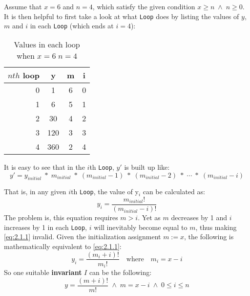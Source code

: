 Assume that $x = 6$ and $n = 4$, which satisfy the given condition $ x \geq n \;\land\; n \geq 0$.  It is then helpful to first take a look at what \texttt{Loop} does by listing the values of $y$, $m$ and $i$ in each \texttt{Loop} (which ends at $i = 4$):

\begin{table}[h]
  \centering
  \begin{tabular}{r||c|c|c}
    \hline
    $nth$ loop & y & m & i \\
    \hline
    0 & 1 & 6 & 0 \\
    1 & 6 & 5 & 1 \\
    2 & 30 & 4 & 2 \\
    3 & 120 & 3 & 3 \\
    4 & 360 & 2 & 4 \\
    \hline
  \end{tabular}
  \caption{Values in each loop when \(x=6\;n=4\)}
  \label{tab:loop}
\end{table}

It is easy to see that in the $i$th \texttt{Loop}, $y'$ is built up like:
\[
  y' =
  y_{initial} \;*\; m_{initial}\;*\;(m_{initial} - 1)\;*\;(m_{initial}-  2)\;*\;\dotsb\;*\; (m_{initial} - i)
\]

That is, in any given $i$th \texttt{Loop},  the value of y$_{i}$ can be calculated as:
\begin{equation}
\label{eq:2.1.1}
y_{i} = \frac{m_{initial}!}{(m_{initial} - i)!}
\end{equation}
The problem is, this equation requires $m > i$.  Yet as $m$ decreases by 1 and $i$ increases by 1 in each \texttt{Loop}, $i$ will inevitably become equal to $m$, thus making \eqref{eq:2.1.1} invalid.  Given the initialization assignment \(m:=x\), the following is mathematically equivalent to \eqref{eq:2.1.1}:
\[
  y_{i} = \frac{(m_{i}+i)!}{m_{i}!} \quad \text{where}\quad m_{i}= x - i
\]
So one suitable \textbf{invariant} \(I\) can be the following:
\begin{equation}
\label{eq:2.1.2}
  y = \frac{(m+i)!}{m!}\;\land\;m=x-i\;\land\;0 \leq i \leq n
\end{equation}
\newcommand{\R}{\(y=(m+i)!/m!\;\land\;m=x-i\;\land\; 0 \leq i \leq n\)}
